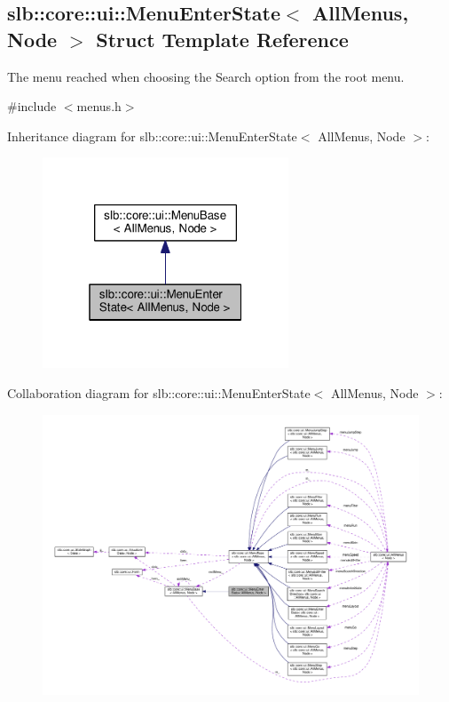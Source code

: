 \hypertarget{structslb_1_1core_1_1ui_1_1MenuEnterState}{}\subsection{slb\+:\+:core\+:\+:ui\+:\+:Menu\+Enter\+State$<$ All\+Menus, Node $>$ Struct Template Reference}
\label{structslb_1_1core_1_1ui_1_1MenuEnterState}


The menu reached when choosing the Search option from the root menu.  




{\ttfamily \#include $<$menus.\+h$>$}



Inheritance diagram for slb\+:\+:core\+:\+:ui\+:\+:Menu\+Enter\+State$<$ All\+Menus, Node $>$\+:\nopagebreak
\begin{figure}[H]
\begin{center}
\leavevmode
\includegraphics[width=208pt]{structslb_1_1core_1_1ui_1_1MenuEnterState__inherit__graph}
\end{center}
\end{figure}


Collaboration diagram for slb\+:\+:core\+:\+:ui\+:\+:Menu\+Enter\+State$<$ All\+Menus, Node $>$\+:\nopagebreak
\begin{figure}[H]
\begin{center}
\leavevmode
\includegraphics[width=350pt]{structslb_1_1core_1_1ui_1_1MenuEnterState__coll__graph}
\end{center}
\end{figure}
